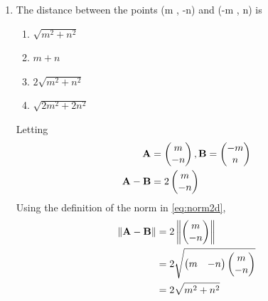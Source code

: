 \documentclass[journal,12pt,twocolumn]{IEEEtran}
\begin{document}
\begin{enumerate}[label=1.\arabic*]
\item The distance between the points (m , -n) and (-m , n) is
\begin{enumerate}
    \item $\sqrt{m^2 + n^2}$
    \item $m + n$
    \item $2\sqrt{m^2 + n^2}$
    \item $\sqrt{2m^2 + 2n^2}$
\end{enumerate}
		\solution Letting 
		\begin{align}
			\mathbf{A} &= \begin{pmatrix}m \\ -n\end{pmatrix}, \mathbf{B}=\begin{pmatrix}-m \\ n\end{pmatrix}
			\\
			\mathbf{A}-\mathbf{B} &= 2\begin{pmatrix}m \\ -n\end{pmatrix}
		\end{align}
Using the definition   of the norm in \eqref{eq:norm2d},
		\begin{align}
\left\lVert\mathbf{A}-\mathbf{B}\right\rVert &=2\left\lVert\begin{pmatrix}m \\ -n\end{pmatrix}\right\rVert
			\\
			&=2 \sqrt{\begin{pmatrix}m & -n\end{pmatrix}\begin{pmatrix}m \\ -n\end{pmatrix}} 
\\
			&			= 2 \sqrt{m^2+n^2}
		\end{align}


\end{enumerate}
\end{document}
